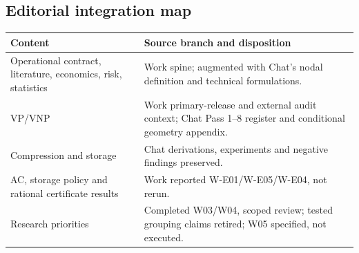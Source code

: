 \documentclass[11pt,letterpaper]{article}
\begin{document}
\subsection{Editorial integration map}
\begin{longtable}{P{.38\linewidth}P{.53\linewidth}}
\toprule Content & Source branch and disposition\\\midrule\endhead
Operational contract, literature, economics, risk, statistics & Work spine; augmented with Chat's nodal definition and technical formulations.\\
VP/VNP & Work primary-release and external audit context; Chat Pass 1--8 register and conditional geometry appendix.\\
Compression and storage & Chat derivations, experiments and negative findings preserved.\\
AC, storage policy and rational certificate results & Work reported W-E01/W-E05/W-E04, not rerun.\\
Research priorities & Completed W03/W04, scoped review; tested grouping claims retired; W05 specified, not executed.\\
\bottomrule
\end{longtable}
\end{document}
